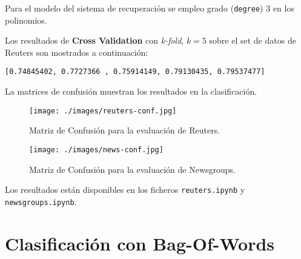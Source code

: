 \documentclass[12pt]{llncs}
\begin{document}
Para el modelo del sistema de recuperación se empleo grado (\verb+degree+) 3 en los polinomios.

Los resultados de \textbf{Cross Validation} con \textit{k-fold}, $k = 5$ sobre el set de datos de Reuters son mostrados a continuación:

\begin{verbatim}
[0.74845402, 0.7727366 , 0.75914149, 0.79130435, 0.79537477]
\end{verbatim}

La matrices de confusión muestran los resultados en la clasificación.

\begin{figure}[!h]
  \texttt{[image: ./images/reuters-conf.jpg]}
  \caption{Matriz de Confusión para la evaluación de Reuters.}
\end{figure}

\newpage

\begin{figure}[!h]
  \texttt{[image: ./images/news-conf.jpg]}
  \caption{Matriz de Confusión para la evaluación de Newsgroups.}
\end{figure}

\newpage

Los resultados están disponibles en los ficheros \verb+reuters.ipynb+ y \verb+newsgroups.ipynb+.

\section {Clasificación con Bag-Of-Words}
\end{document}
